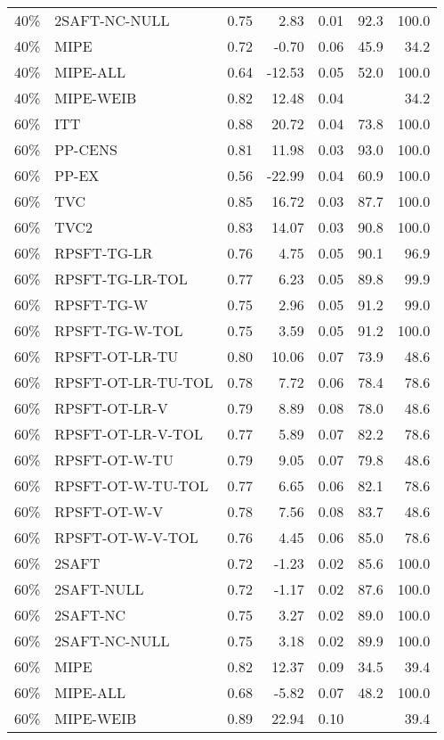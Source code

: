 \begin{table}[ht]
{\begin{tabular}{llrrrrr}
  40\% & 2SAFT-NC-NULL & 0.75 & 2.83 & 0.01 & 92.3 & 100.0 \\ 
  40\% & MIPE & 0.72 & -0.70 & 0.06 & 45.9 & 34.2 \\ 
  40\% & MIPE-ALL & 0.64 & -12.53 & 0.05 & 52.0 & 100.0 \\ 
  40\% & MIPE-WEIB & 0.82 & 12.48 & 0.04 &  & 34.2 \\ 
   \hline
60\% & ITT & 0.88 & 20.72 & 0.04 & 73.8 & 100.0 \\ 
  60\% & PP-CENS & 0.81 & 11.98 & 0.03 & 93.0 & 100.0 \\ 
  60\% & PP-EX & 0.56 & -22.99 & 0.04 & 60.9 & 100.0 \\ 
  60\% & TVC & 0.85 & 16.72 & 0.03 & 87.7 & 100.0 \\ 
  60\% & TVC2 & 0.83 & 14.07 & 0.03 & 90.8 & 100.0 \\ 
   \hline
60\% & RPSFT-TG-LR & 0.76 & 4.75 & 0.05 & 90.1 & 96.9 \\ 
  60\% & RPSFT-TG-LR-TOL & 0.77 & 6.23 & 0.05 & 89.8 & 99.9 \\ 
  60\% & RPSFT-TG-W & 0.75 & 2.96 & 0.05 & 91.2 & 99.0 \\ 
  60\% & RPSFT-TG-W-TOL & 0.75 & 3.59 & 0.05 & 91.2 & 100.0 \\ 
  60\% & RPSFT-OT-LR-TU & 0.80 & 10.06 & 0.07 & 73.9 & 48.6 \\ 
  60\% & RPSFT-OT-LR-TU-TOL & 0.78 & 7.72 & 0.06 & 78.4 & 78.6 \\ 
  60\% & RPSFT-OT-LR-V & 0.79 & 8.89 & 0.08 & 78.0 & 48.6 \\ 
  60\% & RPSFT-OT-LR-V-TOL & 0.77 & 5.89 & 0.07 & 82.2 & 78.6 \\ 
   \hline
60\% & RPSFT-OT-W-TU & 0.79 & 9.05 & 0.07 & 79.8 & 48.6 \\ 
  60\% & RPSFT-OT-W-TU-TOL & 0.77 & 6.65 & 0.06 & 82.1 & 78.6 \\ 
  60\% & RPSFT-OT-W-V & 0.78 & 7.56 & 0.08 & 83.7 & 48.6 \\ 
  60\% & RPSFT-OT-W-V-TOL & 0.76 & 4.45 & 0.06 & 85.0 & 78.6 \\ 
   \hline
60\% & 2SAFT & 0.72 & -1.23 & 0.02 & 85.6 & 100.0 \\ 
  60\% & 2SAFT-NULL & 0.72 & -1.17 & 0.02 & 87.6 & 100.0 \\ 
  60\% & 2SAFT-NC & 0.75 & 3.27 & 0.02 & 89.0 & 100.0 \\ 
  60\% & 2SAFT-NC-NULL & 0.75 & 3.18 & 0.02 & 89.9 & 100.0 \\ 
  60\% & MIPE & 0.82 & 12.37 & 0.09 & 34.5 & 39.4 \\ 
  60\% & MIPE-ALL & 0.68 & -5.82 & 0.07 & 48.2 & 100.0 \\ 
  60\% & MIPE-WEIB & 0.89 & 22.94 & 0.10 &  & 39.4 \\ 
   \hline
\end{tabular}
}
\end{table}
